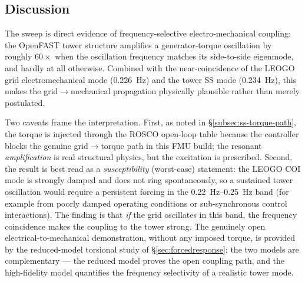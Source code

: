 \subsection{Discussion}
\label{subsec:ss-discussion}

The sweep is direct evidence of frequency-selective electro-mechanical coupling:
the OpenFAST tower structure amplifies a generator-torque oscillation by roughly
\(60\times\) when the oscillation frequency matches its side-to-side eigenmode,
and hardly at all otherwise. Combined with the near-coincidence of the LEOGO grid
electromechanical mode (\SI{0.226}{\hertz}) and the tower SS mode
(\SI{0.234}{\hertz}), this makes the grid\(\to\)mechanical propagation
physically plausible rather than merely postulated.

Two caveats frame the interpretation. First, as noted in
\S\ref{subsec:ss-torque-path}, the torque is injected through the ROSCO
open-loop table because the controller blocks the genuine grid\(\to\)torque path
in this FMU build; the resonant \emph{amplification} is real structural physics,
but the excitation is prescribed. Second, the result is best read as a
\emph{susceptibility} (worst-case) statement: the LEOGO COI mode is strongly
damped and does not ring spontaneously, so a sustained tower oscillation would
require a persistent forcing in the \SIrange{0.22}{0.25}{\hertz} band (for
example from poorly damped operating conditions or sub-synchronous control
interactions). The finding is that \emph{if} the grid oscillates in this band,
the frequency coincidence makes the coupling to the tower strong. The genuinely
open electrical-to-mechanical demonstration, without any imposed torque, is
provided by the reduced-model torsional study of \S\ref{sec:forcedresponse};
the two models are complementary --- the reduced model proves the open coupling
path, and the high-fidelity model quantifies the frequency selectivity of a
realistic tower mode.
